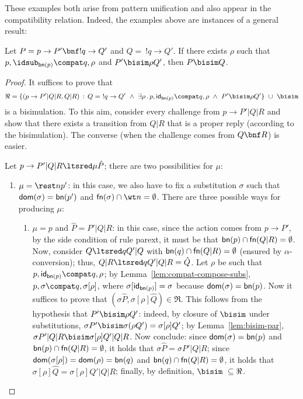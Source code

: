 \documentclass{LMCS}
\begin{document}
These examples both arise from pattern unification and also appear in the compatibility relation.
Indeed, the examples above are instances of a general result:

\begin{prop}
\label{eq-grrr}
Let $P=p\to P'\bnf !q\to Q'$ and $Q=\ !q\to Q'$.
If there exists $\rho$ such that $p,\idsub_{{\sf bn}(p)}\compat q,\rho$ and $P'\bisim\rho Q'$, 
then $P\bisim Q$.
\end{prop}
\begin{proof}
It suffices to prove that
$$
\Re = \{(p \to P'|Q|R,Q|R)\, :\, Q =\,\, !q \to Q'\ \wedge\ 
\exists \rho\,.\, p,{\sf id}_{{\sf bn}(p)}\compat q,\rho\ \wedge\ P'\bisim\rho Q'\}\ \cup\ \bisim
$$
is a bisimulation. To this aim, consider every challenge from $p \to P'|Q|R$ and show that
there exists a transition from $Q|R$ that is a proper reply (according to the bisimulation). 
The converse (when the challenge comes from $Q \bnf R$) is easier.

Let $p \to P'|Q|R \ltsred\mu \hat P$; there are two possibilities for $\mu$:
\begin{enumerate}
\item $\mu = \rest n p'$: in this case, we also have to fix a substitution $\sigma$ such that
${\sf dom}(\sigma) = {\sf bn}(p')$ and ${\sf fn}(\sigma) \cap \wt n = \emptyset$. 
There are three possible ways for producing $\mu$:
	\begin{enumerate}[label=\({\alph*}]
	\item $\mu = p$ and $\hat P = P'|Q|R$: in this case, since the action comes from $p \to P'$,
	by the side condition of rule {\sf parext}, it must be that ${\sf bn}(p) \cap {\sf fn}(Q|R) = \emptyset$. 
	Now, consider $Q \ltsred q Q'|Q$ with ${\sf bn}(q) \cap {\sf fn}(Q|R) = \emptyset$ (ensured by
    $\alpha$-conversion); thus, $Q|R \ltsred q Q'|Q|R = \hat Q$. Let $\rho$ be such that
	$p,{\sf id}_{{\sf bn}(p)}\compat q,\rho$; by Lemma~\ref{lem:compat-compose-subs},
	$p,\sigma \compat q,\sigma[\rho]$, where $\sigma[{\sf id}_{{\sf bn}(p)}] = \sigma$
	because ${\sf dom}(\sigma) = {\sf bn}(p)$. Now it suffices to prove that
	$(\sigma \hat P, \sigma[\rho]\hat Q) \in \Re$. 
	This follows from the hypothesis that $P'\bisim\rho Q'$: indeed, by closure of $\bisim$ under
	substitutions, $\sigma P'\bisim \sigma (\rho Q') = \sigma[\rho]Q'$; by Lemma~\ref{lem:bisim-par},
	$\sigma P'|Q|R \bisim \sigma[\rho]Q'|Q|R$. Now conclude: 
	since ${\sf dom}(\sigma) = {\sf bn}(p)$ and ${\sf bn}(p) \cap {\sf fn}(Q|R) = \emptyset$, it holds that
	$\sigma \hat P = \sigma P'|Q|R$; 
	since ${\sf dom}(\sigma[\rho]) = {\sf dom}(\rho) = {\sf bn}(q)$ and ${\sf bn}(q) \cap {\sf fn}(Q|R) = \emptyset$, 
	it holds that $\sigma[\rho] \hat Q = \sigma[\rho] Q'|Q|R$;
	finally, by definition, $\bisim\ \subseteq \Re$.


\end{enumerate}
\end{enumerate}
\end{proof}
\end{document}
